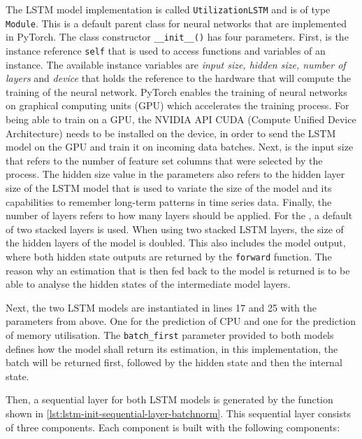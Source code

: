     The LSTM model implementation is called \texttt{UtilizationLSTM} and is of type \texttt{Module}. This is a default parent class for neural networks that are implemented in PyTorch.
    The class constructor \texttt{\_\_init\_\_()} has four parameters. First, is the instance reference \texttt{self} that is used to access functions and variables of an instance. 
    The available instance variables are \emph{input size, hidden size, number of layers} and \emph{device} that holds the reference to the hardware that will compute the training of the neural network.
    PyTorch enables the training of neural networks on graphical computing units (GPU) which accelerates the training process. For being able to train on a GPU, the NVIDIA API CUDA (Compute Unified Device Architecture) needs to be installed on the device, in order to send the LSTM model on the GPU and train it on incoming data batches. 
    Next, is the input size that refers to the number of feature set columns that were selected by the  process.
    The hidden size value in the parameters also refers to the hidden layer size of the LSTM model that is used to variate the size of the model and its capabilities to remember long-term patterns in time series data.
    Finally, the number of layers refers to how many  layers should be applied.
    For the , a default of two stacked layers is used. When using two stacked LSTM layers, the size of the hidden layers of the model is doubled. This also includes the model output, where both hidden state outputs are returned by the \texttt{forward} function.
    The reason why an estimation that is then fed back to the model is returned is to be able to analyse the hidden states of the intermediate model layers.
    
    Next, the two LSTM models are instantiated in lines 17 and 25 with the parameters from above. One for the prediction of CPU and one for the prediction of memory utilisation. The \texttt{batch\_first} parameter provided to both models defines how the model shall return its estimation, in this implementation, the batch will be returned first, followed by the hidden state and then the internal state.
    
    Then, a sequential layer for both LSTM models is generated by the function shown in \ref{lst:lstm-init-sequential-layer-batchnorm}. This sequential layer consists of three components. Each component is built with the following components:
    
